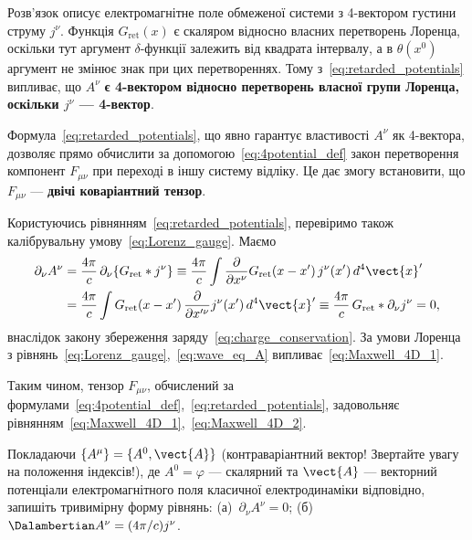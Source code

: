 Розв'язок описує електромагнітне поле обмеженої системи з 4-вектором густини струму $j^{\nu}$. Функція $G_\text{ret}(x)$
є скаляром відносно власних перетворень Лоренца, оскільки тут аргумент $\delta$-функції залежить від квадрата інтервалу,
а в $\theta(x^0)$ аргумент не змінює знак при цих перетвореннях. Тому з~\eqref{eq:retarded_potentials} випливає, що
$A^{\nu}$ \textbf{є 4-вектором відносно перетворень власної групи Лоренца, оскільки $j^{\nu}$ ---
    4-вектор}.

Формула~\eqref{eq:retarded_potentials}, що явно гарантує властивості $A^{\nu}$ як 4-вектора, дозволяє прямо обчислити за
допомогою~\eqref{eq:4potential_def} закон перетворення компонент $F_{\mu\nu}$ при переході в іншу систему відліку. Це
дає змогу встановити, що $F_{\mu\nu}$ --- \textbf{двічі коваріантний тензор}.

Користуючись рівнянням~\eqref{eq:retarded_potentials}, перевіримо також калібрувальну умову~\eqref{eq:Lorenz_gauge}.
Маємо
\begin{align*}
    \partial_{\nu}A^{\nu}
     & = \frac{4\pi}{c}\,\partial_{\nu}\{G_{\text{ret}}*j^{\nu}\}
    \equiv \frac{4\pi}{c}\int\frac{\partial}{\partial x^{\nu}}G_\text{ret}(x-x')\,j^{\nu}(x')\,d^4\vect{x}' \\
     & = \frac{4\pi}{c}\int G_\text{ret}(x-x')\,\frac{\partial}{\partial x'^{\nu}}j^{\nu}(x')\,d^4\vect{x}'
    \equiv \frac{4\pi}{c}\,G_{\text{ret}}*\partial_{\nu}j^{\nu} = 0,
\end{align*}
внаслідок закону збереження заряду~\eqref{eq:charge_conservation}. За умови Лоренца з
рівнянь~\eqref{eq:Lorenz_gauge},~\eqref{eq:wave_eq_A} випливає~\eqref{eq:Maxwell_4D_1}.

Таким чином, тензор $F_{\mu\nu}$, обчислений за формулами~\eqref{eq:4potential_def},~\eqref{eq:retarded_potentials},
задовольняє рівнянням~\eqref{eq:Maxwell_4D_1},~\eqref{eq:Maxwell_4D_2}.

\begin{problem}
    Покладаючи $\{A^{\mu}\}=\{A^0,\vect{A}\}$ (контраваріантний вектор! Звертайте увагу на положення індексів!), де
    $A^0=\varphi$ --- скалярний та $\vect{A}$ --- векторний потенціали електромагнітного поля класичної електродинаміки
    відповідно, запишіть тривимірну форму рівнянь: (а)~$\partial_{\nu}A^{\nu}=0$; (б)~$\Dalambertian
        A^{\nu}=(4\pi/c)j^{\nu}$.
\end{problem}